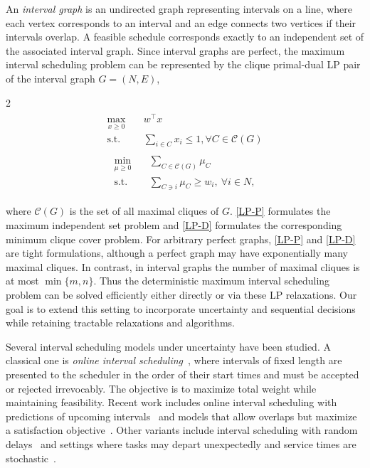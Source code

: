 \documentclass{article}
\newcommand{\st}{\text{s.t.}}
\begin{document}
An \emph{interval graph} is an undirected graph representing intervals on a line, where each vertex corresponds to an interval and an edge connects two vertices if their intervals overlap.
A feasible schedule corresponds exactly to an independent set of the associated interval graph.
Since interval graphs are perfect, the maximum interval scheduling problem can be represented by the clique primal-dual LP pair of the interval graph $G=(N,E)$,
\begin{multicols}{2}
    \noindent
    \begin{align}
\label{LP-P}
\tag{LP-P}
\begin{split}
    \max_{x\geq 0}\quad &w^\top x\\
    \st\quad &\sum_{i\in C}x_i\leq 1, \forall C\in\mathcal{C}(G)
\end{split}
\end{align}
\columnbreak
\begin{align}
\label{LP-D}
\tag{LP-D}
\begin{split}
    \min_{\mu\geq0}\quad &\sum_{C\in\mathcal{C}(G)}\mu_C\\
    \text{s.t.}\quad &\sum_{C\ni i}\mu_C\geq w_i,~\forall i\in N,
\end{split}
\end{align}
\end{multicols}
\noindent
where $\mathcal{C}(G)$ is the set of all maximal cliques of $G$.
\eqref{LP-P} formulates the maximum independent set problem and \eqref{LP-D} formulates the corresponding minimum clique cover problem.
For arbitrary perfect graphs, \eqref{LP-P} and \eqref{LP-D} are tight formulations, {although a perfect graph may have exponentially many maximal cliques.}
In contrast, in interval graphs the number of maximal cliques is at most $\min\{m, n\}$.
Thus the deterministic maximum interval scheduling problem can be solved efficiently either directly or via these LP relaxations.
Our goal is to extend this setting to incorporate uncertainty and sequential decisions while retaining tractable relaxations and algorithms.

Several interval scheduling models under uncertainty have been studied.
A classical one is \emph{online interval scheduling}~\cite{Lipton1994OnlineIS}, where intervals of fixed length are presented to the scheduler in the order of their start times and must be accepted or rejected irrevocably.
The objective is to maximize total weight while maintaining feasibility.
Recent work includes online interval scheduling with predictions of upcoming intervals~\cite{boyar2025onlineintervalschedulingpredictions} and models that allow overlaps but maximize a satisfaction objective~\cite{KOBAYASHI2020673}.
Other variants include interval scheduling with random delays~\cite{BRANDA2024106542} and settings where tasks may depart unexpectedly and service times are stochastic~\cite{xu2024stochasticschedulingabandonmentsgreedy}.
\end{document}
